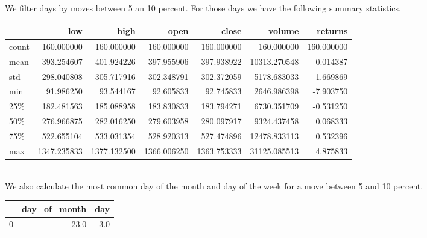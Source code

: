We filter days by moves between 5 an 10 percent. For those days we have the following summary statistics.

\begin{tabular}{lrrrrrr}
\toprule
{} &          low &         high &         open &        close &        volume &     returns \\
\midrule
count &   160.000000 &   160.000000 &   160.000000 &   160.000000 &    160.000000 &  160.000000 \\
mean  &   393.254607 &   401.924226 &   397.955906 &   397.938922 &  10313.270548 &   -0.014387 \\
std   &   298.040808 &   305.717916 &   302.348791 &   302.372059 &   5178.683033 &    1.669869 \\
min   &    91.986250 &    93.544167 &    92.605833 &    92.745833 &   2646.986398 &   -7.903750 \\
25\%   &   182.481563 &   185.088958 &   183.830833 &   183.794271 &   6730.351709 &   -0.531250 \\
50\%   &   276.966875 &   282.016250 &   279.603958 &   280.097917 &   9324.437458 &    0.068333 \\
75\%   &   522.655104 &   533.031354 &   528.920313 &   527.474896 &  12478.833113 &    0.532396 \\
max   &  1347.235833 &  1377.132500 &  1366.006250 &  1363.753333 &  31125.085513 &    4.875833 \\
\bottomrule
\end{tabular}
\vspace{1cm}\\
We also calculate the most common day of the month and day of the week for a move between 5 and 10 percent.
\vspace{1cm}\\
\begin{tabular}{lrr}
\toprule
{} &  day\_of\_month &  day \\
\midrule
0 &          23.0 &  3.0 \\
\bottomrule
\end{tabular}
